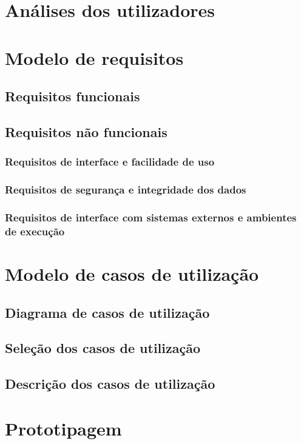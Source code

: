 \documentclass[11pt, twoside]{report}
\begin{document}
 	

	\chapter{Análises dos utilizadores}
	
	\chapter{Modelo de requisitos}
	\section{Requisitos funcionais}
	\section{Requisitos não funcionais}
	\subsection{Requisitos de interface e facilidade de uso}
	\subsection{Requisitos de segurança e integridade dos dados}
	\subsection{Requisitos de interface com sistemas externos e ambientes de execução}
	
	\chapter{Modelo de casos de utilização}
	\section{Diagrama de casos de utilização}
	\section{Seleção dos casos de utilização}
	\section{Descrição dos casos de utilização}
	
	\chapter{Prototipagem}
	
\end{document}
